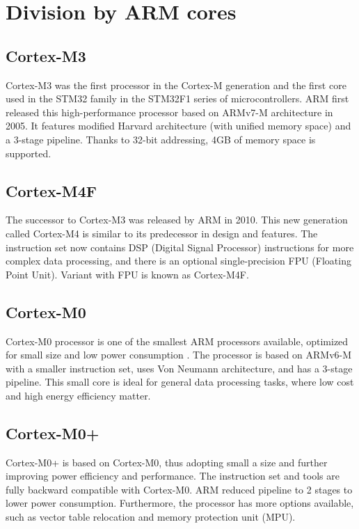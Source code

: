 \section{Division by ARM cores}
\label{sec:stm_arm_division}
	\subsection{Cortex-M3}
	\label{sub:stm_m3}
Cortex-M3 was the first processor in the Cortex-M generation and the first core used in the STM32 family in the STM32F1 series of microcontrollers. ARM first released this high-performance processor based on ARMv7-M architecture in 2005. It features modified Harvard architecture (with unified memory space) and a 3-stage pipeline. Thanks to 32-bit addressing, 4GB of memory space is supported.
	
	\subsection{Cortex-M4F}
	\label{sub:stm_m4}
The successor to Cortex-M3 was released by ARM in 2010. This new generation called Cortex-M4 is similar to its predecessor in design and features. The instruction set now contains DSP (Digital Signal Processor) instructions for more complex data processing, and there is an optional single-precision FPU (Floating Point Unit). Variant with FPU is known as Cortex-M4F. 
	
	\subsection{Cortex-M0}
	\label{sub:stm_m0}		%
Cortex-M0 processor is one of the smallest ARM processors available, optimized for small size and low power consumption \cite{m0_web}. The processor is based on ARMv6-M with a smaller instruction set, uses Von Neumann architecture, and has a 3-stage pipeline. This small core is ideal for general data processing tasks, where low cost and high energy efficiency matter.
	
	\subsection{Cortex-M0+}
	\label{sub:stm_m0_plus}
Cortex-M0+ is based on Cortex-M0, thus adopting small a size and further improving power efficiency and performance. The instruction set and tools are fully backward compatible with Cortex-M0. ARM reduced pipeline to 2 stages to lower power consumption. Furthermore, the processor has more options available, such as vector table relocation and memory protection unit (MPU).
	
